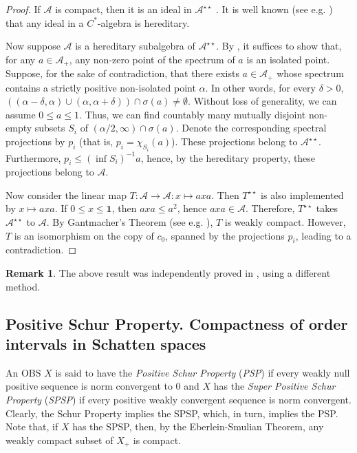 \documentclass[12pt]{amsart}
\theoremstyle{plain}
\theoremstyle{definition}
\newtheorem{remark}[theorem]{Remark}
\renewcommand{\leq}{\leqslant}
\newcommand{\one}{\mathbf{1}}
\newcommand{\A}{\mathcal{A}}
\begin{document}
\begin{proof}
If $\A$ is compact, then it is an ideal in $\A^{\star\star}$ \cite{Yl75PAMS}.
It is well known (see e.g. \cite[Proposition II.5.3.2]{Bl})
that any ideal in a $C^*$-algebra is hereditary.

Now suppose $\A$ is a hereditary subalgebra of $\A^{\star\star}$.
By \cite[Exercise 4.7.20]{Dix}, it suffices to show that, for any
$a \in \A_+$, any non-zero point of the spectrum of $a$ is an isolated point.
Suppose, for the sake of contradiction, that there exists $a \in \A_+$ whose
spectrum contains a strictly positive non-isolated point $\alpha$. In other
words, for every $\delta > 0$,
$((\alpha - \delta, \alpha) \cup (\alpha, \alpha + \delta))
 \cap \sigma(a) \neq \emptyset$.
Without loss of generality, we can assume $0 \leq a \leq 1$.
Thus, we can find countably many mutually disjoint non-empty subsets $S_i$ of
$(\alpha/2,\infty) \cap \sigma(a)$. Denote the corresponding
spectral projections by $p_i$ (that is, $p_i = \chi_{S_i}(a)$).
These projections belong to $\A^{\star\star}$.
Furthermore, $p_i \leq (\inf S_i)^{-1} a$,
hence, by the hereditary property, these projections belong to $\A$.

Now consider the linear map $T : \A \to \A : x \mapsto axa$. Then $T^{\star\star}$
is also implemented by $x \mapsto axa$. If $0 \leq x \leq \one$, then
$axa \leq a^2$, hence $axa \in \A$. Therefore,
$T^{\star\star}$ takes $\A^{\star\star}$ to $\A$. By Gantmacher's Theorem
(see e.g. \cite[Theorem 5.23]{AB}), $T$ is weakly compact.
However, $T$ is an isomorphism on the copy of
$c_0$, spanned by the projections $p_i$, leading to a contradiction.
\end{proof}

\begin{remark}\label{rem:blecher}
The above result was independently proved in \cite{Ble}, using
a different method.
\end{remark}

\subsection{Positive Schur Property. Compactness of order intervals
 in Schatten spaces} \label{ss:psp}

An OBS $X$ is said to have the \emph{Positive Schur Property} (\emph{PSP})
if every weakly null positive sequence is norm convergent to 0 and $X$ has the
\emph{Super Positive Schur Property} (\emph{SPSP}) if every positive weakly convergent
sequence is norm convergent. Clearly, the Schur Property implies the SPSP,
which, in turn, implies the PSP. Note that, if $X$ has
the SPSP, then, by the Eberlein-Smulian Theorem, any weakly compact subset of $X_+$
is compact.
\end{document}
